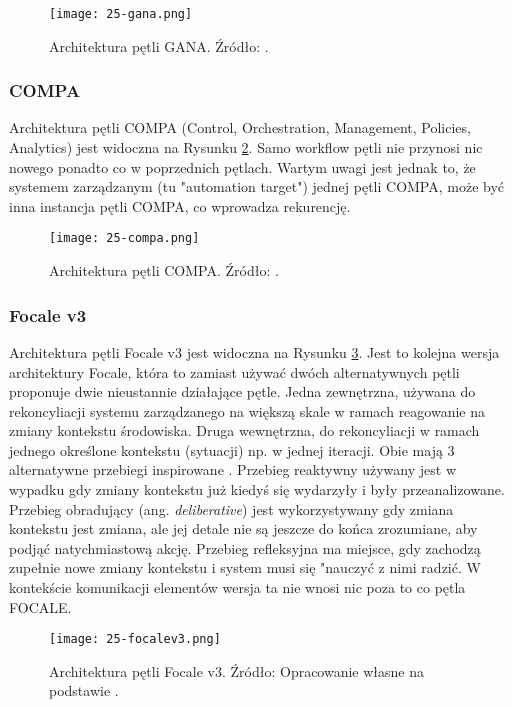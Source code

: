 \begin{figure}[!h]
    \centering \texttt{[image: 25-gana.png]}
    \caption{Architektura pętli GANA. Źródło: \cite{etsieni2024}.}\label{fig:25-gana}
\end{figure}

\subsubsection{COMPA}
Architektura pętli COMPA (Control, Orchestration, Management, Policies, Analytics) \cite{doyle2014} jest widoczna na Rysunku \ref{fig:25-compa}. Samo workflow pętli nie przynosi nic nowego ponadto co w poprzednich pętlach. Wartym uwagi jest jednak to, że systemem zarządzanym (tu "automation target") jednej pętli COMPA, może być inna instancja pętli COMPA, co wprowadza rekurencję. 

\begin{figure}[!h]
    \centering \texttt{[image: 25-compa.png]}
    \caption{Architektura pętli COMPA. Źródło: \cite{etsieni2024}.}\label{fig:25-compa}
\end{figure}

\subsubsection{Focale v3}
Architektura pętli Focale v3 \cite{strassner2009} jest widoczna na Rysunku \ref{fig:25-focalev3}. Jest to kolejna wersja architektury Focale, która to zamiast używać dwóch alternatywnych pętli proponuje dwie nieustannie działające pętle. Jedna zewnętrzna, używana do rekoncyliacji systemu zarządzanego na większą skale w ramach reagowanie na zmiany kontekstu środowiska. Druga wewnętrzna, do rekoncyliacji w ramach jednego określone kontekstu (sytuacji) np. w jednej iteracji. Obie mają 3 alternatywne przebiegi inspirowane \cite{minsky1986}. Przebieg reaktywny używany jest w wypadku gdy zmiany kontekstu już kiedyś się wydarzyły i były przeanalizowane. Przebieg obradujący (ang. \textit{deliberative}) jest wykorzystywany gdy zmiana kontekstu jest zmiana, ale jej detale nie są jeszcze do końca zrozumiane, aby podjąć natychmiastową akcję. Przebieg refleksyjna ma miejsce, gdy zachodzą zupełnie nowe zmiany kontekstu i system musi się "nauczyć z nimi radzić. W kontekście komunikacji elementów wersja ta nie wnosi nic poza to co pętla FOCALE.

\begin{figure}[!h]
    \centering \texttt{[image: 25-focalev3.png]}
    \caption{Architektura pętli Focale v3. Źródło: Opracowanie własne na podstawie \cite{etsieni2024}.}\label{fig:25-focalev3}
\end{figure}
